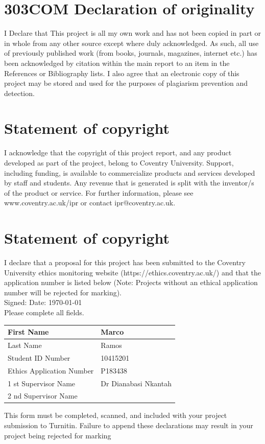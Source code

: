 \newpage
\section*{303COM Declaration of originality}
I Declare that This project is all my own work and has not been 
copied in part or in whole from any
other source except where duly acknowledged. As such, all use of 
previously published work (from
books, journals, magazines, internet etc.) has been acknowledged 
by citation within the main report
to an item in the References or Bibliography lists. I also agree 
that an electronic copy of this project
may be stored and used for the purposes of plagiarism prevention 
and detection.
\section*{Statement of copyright}
I acknowledge that the copyright of this project report, and any 
product developed as part of the
project, belong to Coventry University. Support, including 
funding, is available to commercialize
products and services developed by staff and students. Any 
revenue that is generated is split with the
inventor/s of the product or service. For further information, 
please see www.coventry.ac.uk/ipr or
contact ipr@coventry.ac.uk.
\section*{Statement of copyright}
I declare that a proposal for this project has been submitted to 
the Coventry University ethics
monitoring website (https://ethics.coventry.ac.uk/) and that the 
application number is listed below
(Note: Projects without an ethical application number will be 
rejected for marking).\\

Signed: Date: \today \\

Please complete all fields.

\begin{table}[H]
	\centering
	\begin{tabular}{|l|p{5cm}|}
		\hline	First Name & Marco \\
		\hline	Last Name & Ramos \\
		\hline	Student ID Number & 10415201 \\
		\hline	Ethics Application Number & P183438 \\
		\hline	1 st Supervisor Name & Dr Dianabasi Nkantah \\
		\hline	2 nd Supervisor Name & \\
		\hline
	\end{tabular}
\end{table}

This form must be completed, scanned, and included with your 
project submission to Turnitin. Failure to append
these declarations may result in your project being rejected for 
marking